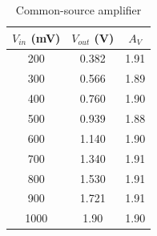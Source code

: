 \begin{table}[hbtp]
  \centering
  \begin{tabular}{ccc}
    $V_{in}$ (\si{mV}) & $V_{out}$ (\si{V}) & $A_V$ \\
    \hline
    200                & 0.382              & 1.91  \\
    300                & 0.566              & 1.89  \\
    400                & 0.760              & 1.90  \\
    500                & 0.939              & 1.88  \\
    600                & 1.140              & 1.90  \\
    700                & 1.340              & 1.91  \\
    800                & 1.530              & 1.91  \\
    900                & 1.721              & 1.91  \\
    1000               & 1.90               & 1.90  \\
  \end{tabular}
  \caption{\label{tab:common-source} Common-source amplifier}
\end{table}



